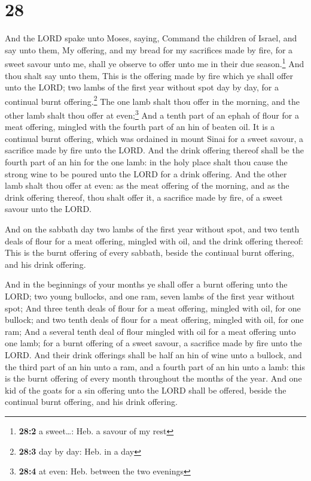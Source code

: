 \hypertarget{section-27}{%
\section{28}\label{section-27}}

 And the LORD spake unto Moses, saying, 
Command the children of Israel, and say unto them, My offering, and my
bread for my sacrifices made by fire, for a sweet savour unto me, shall
ye observe to offer unto me in their due season.\footnote{\textbf{28:2}
  a sweet\ldots: Heb. a savour of my rest}  And thou shalt
say unto them, This is the offering made by fire which ye shall offer
unto the LORD; two lambs of the first year without spot day by day, for
a continual burnt offering.\footnote{\textbf{28:3} day by day: Heb. in a
  day}  The one lamb shalt thou offer in the morning, and
the other lamb shalt thou offer at even;\footnote{\textbf{28:4} at even:
  Heb. between the two evenings}  And a tenth part of an
ephah of flour for a meat offering, mingled with the fourth part of an
hin of beaten oil.  It is a continual burnt offering,
which was ordained in mount Sinai for a sweet savour, a sacrifice made
by fire unto the LORD.  And the drink offering thereof
shall be the fourth part of an hin for the one lamb: in the holy place
shalt thou cause the strong wine to be poured unto the LORD for a drink
offering.  And the other lamb shalt thou offer at even: as
the meat offering of the morning, and as the drink offering thereof,
thou shalt offer it, a sacrifice made by fire, of a sweet savour unto
the LORD.

 And on the sabbath day two lambs of the first year
without spot, and two tenth deals of flour for a meat offering, mingled
with oil, and the drink offering thereof:  This is the
burnt offering of every sabbath, beside the continual burnt offering,
and his drink offering.

 And in the beginnings of your months ye shall offer a
burnt offering unto the LORD; two young bullocks, and one ram, seven
lambs of the first year without spot;  And three tenth
deals of flour for a meat offering, mingled with oil, for one bullock;
and two tenth deals of flour for a meat offering, mingled with oil, for
one ram;  And a several tenth deal of flour mingled with
oil for a meat offering unto one lamb; for a burnt offering of a sweet
savour, a sacrifice made by fire unto the LORD.  And
their drink offerings shall be half an hin of wine unto a bullock, and
the third part of an hin unto a ram, and a fourth part of an hin unto a
lamb: this is the burnt offering of every month throughout the months of
the year.  And one kid of the goats for a sin offering
unto the LORD shall be offered, beside the continual burnt offering, and
his drink offering.

